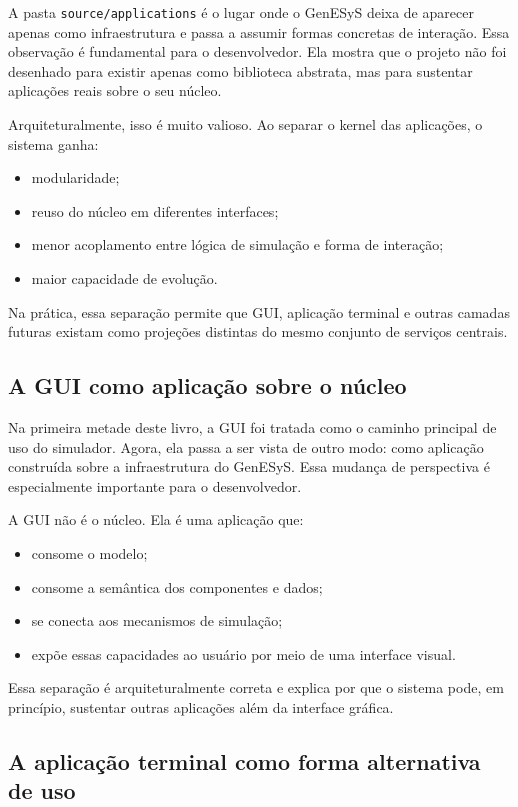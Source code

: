 A pasta \texttt{source/applications} é o lugar onde o GenESyS deixa de aparecer apenas como infraestrutura e passa a assumir formas concretas de interação. Essa observação é fundamental para o desenvolvedor. Ela mostra que o projeto não foi desenhado para existir apenas como biblioteca abstrata, mas para sustentar aplicações reais sobre o seu núcleo.

Arquiteturalmente, isso é muito valioso. Ao separar o kernel das aplicações, o sistema ganha:
\begin{itemize}
    \item modularidade;
    \item reuso do núcleo em diferentes interfaces;
    \item menor acoplamento entre lógica de simulação e forma de interação;
    \item maior capacidade de evolução.
\end{itemize}

Na prática, essa separação permite que GUI, aplicação terminal e outras camadas futuras existam como projeções distintas do mesmo conjunto de serviços centrais.

\subsection{A GUI como aplicação sobre o núcleo}
\label{subsec:cap10_gui_como_aplicacao_sobre_nucleo}

Na primeira metade deste livro, a GUI foi tratada como o caminho principal de uso do simulador. Agora, ela passa a ser vista de outro modo: como aplicação construída sobre a infraestrutura do GenESyS. Essa mudança de perspectiva é especialmente importante para o desenvolvedor.

A GUI não é o núcleo. Ela é uma aplicação que:
\begin{itemize}
    \item consome o modelo;
    \item consome a semântica dos componentes e dados;
    \item se conecta aos mecanismos de simulação;
    \item expõe essas capacidades ao usuário por meio de uma interface visual.
\end{itemize}

Essa separação é arquiteturalmente correta e explica por que o sistema pode, em princípio, sustentar outras aplicações além da interface gráfica.

\subsection{A aplicação terminal como forma alternativa de uso}
\label{subsec:cap10_aplicacao_terminal_forma_alternativa}

